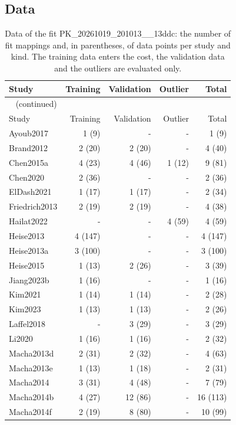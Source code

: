 \subsection{Data}

\begin{longtable}{lrrrr}
\caption{Data of the fit PK\_20261019\_201013\_\_13ddc: the number of fit mappings and, in parentheses, of data points per study and kind. The training data enters the cost, the validation data and the outliers are evaluated only.}\label{tab:data:PK_20261019_201013__13ddc} \\
\toprule
Study & Training & Validation & Outlier & Total \\
\midrule
\endfirsthead
\multicolumn{5}{l}{\small\tablename~\thetable{} (continued)} \\
\toprule
Study & Training & Validation & Outlier & Total \\
\midrule
\endhead
\bottomrule
\endlastfoot
Ayoub2017 & 1 (9) & - & - & 1 (9) \\
Brand2012 & 2 (20) & 2 (20) & - & 4 (40) \\
Chen2015a & 4 (23) & 4 (46) & 1 (12) & 9 (81) \\
Chen2020 & 2 (36) & - & - & 2 (36) \\
ElDash2021 & 1 (17) & 1 (17) & - & 2 (34) \\
Friedrich2013 & 2 (19) & 2 (19) & - & 4 (38) \\
Hailat2022 & - & - & 4 (59) & 4 (59) \\
Heise2013 & 4 (147) & - & - & 4 (147) \\
Heise2013a & 3 (100) & - & - & 3 (100) \\
Heise2015 & 1 (13) & 2 (26) & - & 3 (39) \\
Jiang2023b & 1 (16) & - & - & 1 (16) \\
Kim2021 & 1 (14) & 1 (14) & - & 2 (28) \\
Kim2023 & 1 (13) & 1 (13) & - & 2 (26) \\
Laffel2018 & - & 3 (29) & - & 3 (29) \\
Li2020 & 1 (16) & 1 (16) & - & 2 (32) \\
Macha2013d & 2 (31) & 2 (32) & - & 4 (63) \\
Macha2013e & 1 (13) & 1 (18) & - & 2 (31) \\
Macha2014 & 3 (31) & 4 (48) & - & 7 (79) \\
Macha2014b & 4 (27) & 12 (86) & - & 16 (113) \\
Macha2014f & 2 (19) & 8 (80) & - & 10 (99) \\

\end{longtable}
